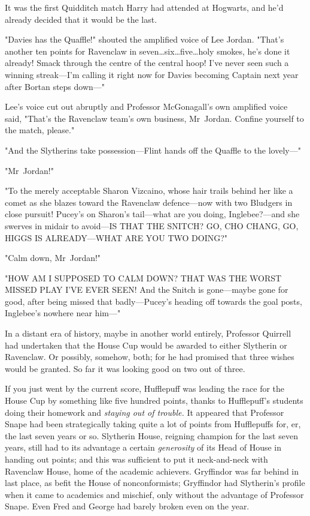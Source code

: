 It was the first Quidditch match Harry had attended at Hogwarts, and he'd
already decided that it would be the last.

"Davies has the Quaffle!" shouted the amplified voice of Lee Jordan. "That's
another ten points for Ravenclaw in seven…six…five…holy
smokes, he's done it already! Smack through the centre of the central hoop!
I've never seen such a winning streak—I'm calling it right now for Davies
becoming Captain next year after Bortan steps down—"

Lee's voice cut out abruptly and Professor McGonagall's own amplified voice
said, "That's the Ravenclaw team's own business, Mr~Jordan. Confine yourself
to the match, please."

"And the Slytherins take possession—Flint hands off the Quaffle to the
lovely—"

"Mr~Jordan!"

"To the merely acceptable Sharon Vizcaino, whose hair trails behind her like a
comet as she blazes toward the Ravenclaw defence—now with two Bludgers in
close pursuit! Pucey's on Sharon's tail—what are you doing, Inglebee?—and
she swerves in midair to avoid—IS THAT THE SNITCH? GO, CHO CHANG, GO, HIGGS
IS ALREADY—WHAT ARE YOU TWO DOING?"

"Calm down, Mr~Jordan!"

"HOW AM I SUPPOSED TO CALM DOWN? THAT WAS THE WORST MISSED PLAY I'VE EVER SEEN!
And the Snitch is gone—maybe gone for good, after being missed that
badly—Pucey's heading off towards the goal posts, Inglebee's nowhere near
him—"

In a distant era of history, maybe in another world entirely, Professor
Quirrell had undertaken that the House Cup would be awarded to either Slytherin
or Ravenclaw. Or possibly, somehow, both; for he had promised that three wishes
would be granted. So far it was looking good on two out of three.

If you just went by the current score, Hufflepuff was leading the race for the
House Cup by something like five hundred points, thanks to Hufflepuff's
students doing their homework and \emph{staying out of trouble.} It appeared
that Professor Snape had been strategically taking quite a lot of points from
Hufflepuffs for, er, the last seven years or so. Slytherin House, reigning
champion for the last seven years, still had to its advantage a certain
\emph{generosity} of its Head of House in handing out points; and this was
sufficient to put it neck-and-neck with Ravenclaw House, home of the academic
achievers. Gryffindor was far behind in last place, as befit the House of
nonconformists; Gryffindor had Slytherin's profile when it came to academics
and mischief, only without the advantage of Professor Snape. Even Fred and
George had barely broken even on the year.


